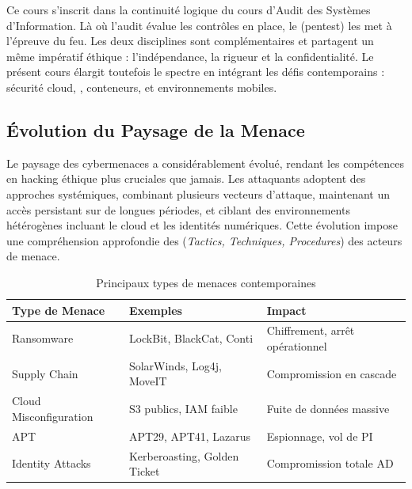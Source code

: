 Ce cours s'inscrit dans la continuité logique du cours d'Audit des Systèmes
d'Information. Là où l'audit évalue les contrôles en place, le  (pentest) les met à l'épreuve du feu. Les deux disciplines sont
complémentaires et partagent un même impératif éthique : l'indépendance, la rigueur
et la confidentialité. Le présent cours élargit toutefois le spectre en intégrant
les défis contemporains : sécurité cloud, , conteneurs, et environnements
mobiles.

\subsection*{Évolution du Paysage de la Menace}

Le paysage des cybermenaces a considérablement évolué, rendant les compétences en
hacking éthique plus cruciales que jamais. Les attaquants adoptent des approches
systémiques, combinant plusieurs vecteurs d'attaque, maintenant un accès persistant
sur de longues périodes, et ciblant des environnements hétérogènes incluant le cloud
et les identités numériques. Cette évolution impose une compréhension approfondie
des  (\textit{Tactics, Techniques, Procedures}) des acteurs de menace.

\begin{table}[htbp]
\centering
\caption{Principaux types de menaces contemporaines}
\label{tab:menaces}
\begin{tabular}{lll}
\toprule
\textbf{Type de Menace} & \textbf{Exemples} & \textbf{Impact} \\
\midrule
Ransomware             & LockBit, BlackCat, Conti          & Chiffrement, arrêt opérationnel \\
Supply Chain           & SolarWinds, Log4j, MoveIT         & Compromission en cascade \\
Cloud Misconfiguration & S3 publics, IAM faible             & Fuite de données massive \\
APT                    & APT29, APT41, Lazarus              & Espionnage, vol de PI \\
Identity Attacks       & Kerberoasting, Golden Ticket       & Compromission totale AD \\
\bottomrule
\end{tabular}
\end{table}

